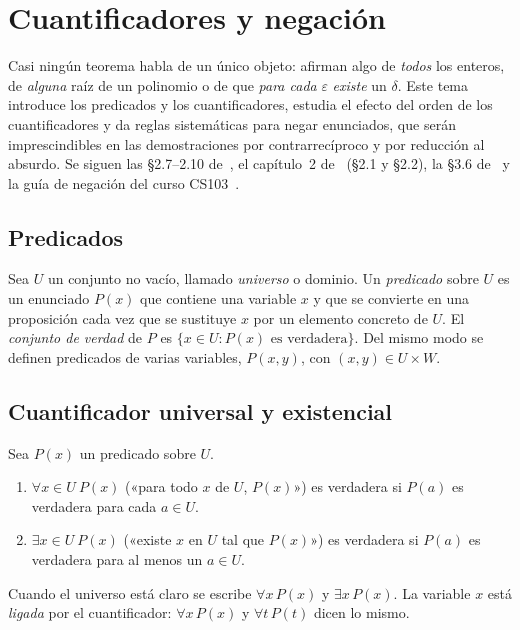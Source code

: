 \chapter{Cuantificadores y negación}
\label{tema:2}

Casi ningún teorema habla de un único objeto: afirman algo de \emph{todos} los enteros, de \emph{alguna} raíz de un polinomio o de que \emph{para cada} $\varepsilon$ \emph{existe} un $\delta$. Este tema introduce los predicados y los cuantificadores, estudia el efecto del orden de los cuantificadores y da reglas sistemáticas para negar enunciados, que serán imprescindibles en las demostraciones por contrarrecíproco y por reducción al absurdo. Se siguen las §2.7–2.10 de~\cite{hammack}, el capítulo~2 de~\cite{velleman} (§2.1 y §2.2), la §3.6 de~\cite{mcs} y la guía de negación del curso CS103~\cite{cs103}.

\section{Predicados}

\begin{definicion}[Predicado]\label{def:predicado}
Sea $U$ un conjunto no vacío, llamado \emph{universo} o dominio. Un \emph{predicado} sobre $U$ es un enunciado $P(x)$ que contiene una variable $x$ y que se convierte en una proposición cada vez que se sustituye $x$ por un elemento concreto de $U$. El \emph{conjunto de verdad} de $P$ es $\{x\in U: P(x)\text{ es verdadera}\}$. Del mismo modo se definen predicados de varias variables, $P(x,y)$, con $(x,y)\in U\times W$.
\end{definicion}

\addtocounter{definicion}{1}%

\section{Cuantificador universal y existencial}

\begin{definicion}[Cuantificadores]\label{def:cuantificadores}
Sea $P(x)$ un predicado sobre $U$.
\begin{enumerate}
  \item $\forall x\in U\ P(x)$ («para todo $x$ de $U$, $P(x)$») es verdadera si $P(a)$ es verdadera para cada $a\in U$.
  \item $\exists x\in U\ P(x)$ («existe $x$ en $U$ tal que $P(x)$») es verdadera si $P(a)$ es verdadera para al menos un $a\in U$.
\end{enumerate}
Cuando el universo está claro se escribe $\forall x\,P(x)$ y $\exists x\,P(x)$. La variable $x$ está \emph{ligada} por el cuantificador: $\forall x\,P(x)$ y $\forall t\,P(t)$ dicen lo mismo.
\end{definicion}

